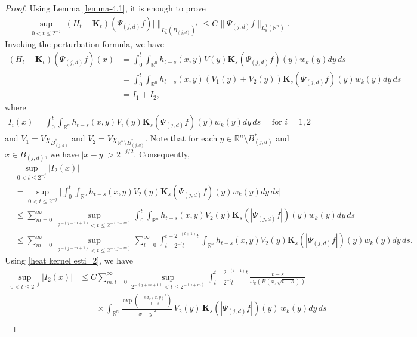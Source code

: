 \documentclass[11pt, reqno]{amsproc}
\theoremstyle{definition}
\theoremstyle{remark}
\numberwithin{equation}{section}
\begin{document}
\begin{proof}
    Using Lemma \ref{lemma-4.1}, it is enough to prove 
    \begin{align*}
        \Bigg\| \sup\limits_{0<t\leq2^{-j}} \big| (H_t-\mathbf{K}_t) (\Psi_{(j,d)}f)\big| \Bigg\|_{L_k^1(B_{(j,d)})^*} \leq C \|\Psi_{(j,d)}f\|_{L_k^1(\mathbb{R}^n)}.
    \end{align*}
    Invoking the perturbation formula, we have 
    \begin{align*}
        (H_t-\mathbf{K}_t) (\Psi_{(j,d)}f)(x) & = \int_0^t \int_{\mathbb{R}^n} h_{t-s}(x,y)V(y)\mathbf{K}_s(\Psi_{(j,d)}f)(y)w_k(y)dy\,ds\\
        &= \int_0^t \int_{\mathbb{R}^n}  h_{t-s}(x,y)(V_1(y)+V_2(y))\mathbf{K}_s(\Psi_{(j,d)}f)(y)w_k(y)dy\,ds\\
        & =I_1+I_2,
    \end{align*}
where 
\begin{align*}
    I_i(x) = \int_0^t \int_{\mathbb{R}^n}  h_{t-s}(x,y)V_i(y)\mathbf{K}_s(\Psi_{(j,d)}f)(y)w_k(y)dy\,ds \quad \text{ for } i=1,2 
\end{align*}
and $V_1=V\chi_{B_{(j,d)}^*}$ and $V_2=V\chi_{\mathbb{R}^n \setminus B_{(j,d)}^*}$. Note that for each $y\in \mathbb{R}^n \setminus B_{(j,d)}^* $ and $x\in B_{(j,d)}$, we have $|x-y|> 2^{-j/2}$. Consequently, 
\begin{align*}
   &\sup\limits_{0<t\leq 2^{-j}}|I_2(x)| \\&=  \sup\limits_{0<t\leq 2^{-j}}\Bigg| \int_0^t \int_{\mathbb{R}^n} h_{t-s}(x,y)V_2(y)\mathbf{K}_s(\Psi_{(j,d)}f)(y)w_k(y)dy\,ds
   \Bigg|\\
   & \leq \sum_{m=0}^\infty\, \sup\limits_{2^{-(j+m+1)}<t\leq 2^{-(j+m)}}\int_0^t \int_{\mathbb{R}^n} h_{t-s}(x,y)V_2(y)\mathbf{K}_s(|\Psi_{(j,d)}f|)(y)w_k(y)dy\,ds\\
   &  \leq \sum_{m=0}^\infty \,\sup\limits_{2^{-(j+m+1)}<t\leq 2^{-(j+m)}} \sum_{l=0}^\infty  \int_{t-2^{-l}t}^{t-2^{-(l+1)}t} \int_{\mathbb{R}^n} h_{t-s}(x,y)V_2(y)\mathbf{K}_s(|\Psi_{(j,d)}f|)(y)w_k(y)dy\,ds.
 \end{align*} Using \eqref{heat kernel esti_2}, we have
\begin{align*}
\sup_{0<t \leq 2^{-j}} |I_2(x)|
&\leq C \sum_{m,l=0}^\infty 
\sup_{2^{-(j+m+1)} < t \leq 2^{-(j+m)}} 
\int_{t-2^{-l}t}^{t-2^{-(l+1)}t}  
\frac{t-s}{\omega_k(B(x,\sqrt{t-s}))} \\
&\quad \quad \times \int_{\mathbb{R}^n} 
\frac{\exp\left(-\frac{c\, d_\mathcal{O}(x,y)^2}{t-s}\right)}{|x-y|^2} 
\, V_2(y)\, \mathbf{K}_s(|\Psi_{(j,d)}f|)(y)\, w_k(y)dy\, ds \\

\end{align*}
\end{proof}
\end{document}
